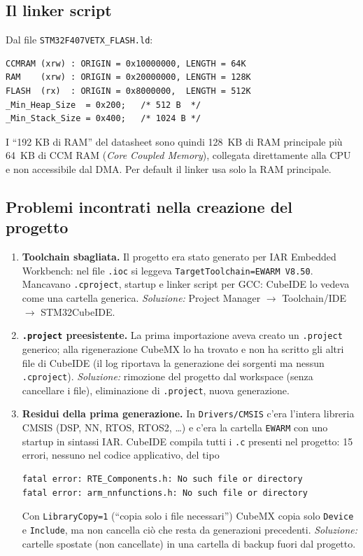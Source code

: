 \documentclass[11pt,a4paper]{article}
\newcommand{\code}[1]{\texttt{\small #1}}
\begin{document}
\subsection{Il linker script}
Dal file \code{STM32F407VETX\_FLASH.ld}:
\begin{lstlisting}[style=sh]
CCMRAM (xrw) : ORIGIN = 0x10000000, LENGTH = 64K
RAM    (xrw) : ORIGIN = 0x20000000, LENGTH = 128K
FLASH  (rx)  : ORIGIN = 0x8000000,  LENGTH = 512K
_Min_Heap_Size  = 0x200;   /* 512 B  */
_Min_Stack_Size = 0x400;   /* 1024 B */
\end{lstlisting}
I ``192 KB di RAM'' del datasheet sono quindi 128~KB di RAM principale più 64~KB di CCM RAM
(\emph{Core Coupled Memory}), collegata direttamente alla CPU e non accessibile dal DMA.
Per default il linker usa solo la RAM principale.

\subsection{Problemi incontrati nella creazione del progetto}
\begin{enumerate}
\item \textbf{Toolchain sbagliata.} Il progetto era stato generato per IAR Embedded Workbench:
  nel file \code{.ioc} si leggeva \code{TargetToolchain=EWARM V8.50}. Mancavano
  \code{.cproject}, startup e linker script per GCC: CubeIDE lo vedeva come una cartella generica.
  \emph{Soluzione:} Project Manager $\to$ Toolchain/IDE $\to$ STM32CubeIDE.
\item \textbf{\code{.project} preesistente.} La prima importazione aveva creato un \code{.project}
  generico; alla rigenerazione CubeMX lo ha trovato e non ha scritto gli altri file di CubeIDE
  (il log riportava la generazione dei sorgenti ma nessun \code{.cproject}).
  \emph{Soluzione:} rimozione del progetto dal workspace (senza cancellare i file), eliminazione di
  \code{.project}, nuova generazione.
\item \textbf{Residui della prima generazione.} In \code{Drivers/CMSIS} c'era l'intera libreria CMSIS
  (DSP, NN, RTOS, RTOS2, \dots) e c'era la cartella \code{EWARM} con uno startup in sintassi IAR.
  CubeIDE compila tutti i \code{.c} presenti nel progetto: 15 errori, nessuno nel codice applicativo, del tipo
\begin{lstlisting}[style=sh]
fatal error: RTE_Components.h: No such file or directory
fatal error: arm_nnfunctions.h: No such file or directory
\end{lstlisting}
  Con \code{LibraryCopy=1} (``copia solo i file necessari'') CubeMX copia solo \code{Device} e
  \code{Include}, ma non cancella ciò che resta da generazioni precedenti.
  \emph{Soluzione:} cartelle spostate (non cancellate) in una cartella di backup fuori dal progetto.
\end{enumerate}
\end{document}
